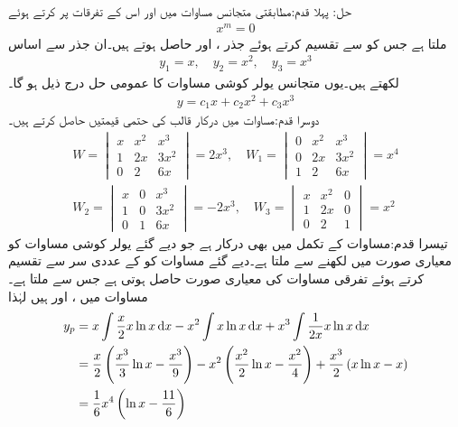 حل: پہلا قدم:\quad مطابقتی متجانس مساوات میں  اور اس کے تفرقات  پر کرتے ہوئے
\begin{align*}
[m(m-1)(m-1)-3m(m-1)+6m-6]x^m=0
\end{align*}
ملتا ہے جس کو  سے تقسیم کرتے ہوئے  جذر ،  اور  حاصل ہوتے ہیں۔ان جذر سے اساس
\begin{align*}
y_1=x, \quad y_2=x^2,\quad y_3=x^3
\end{align*}
لکھتے ہیں۔یوں متجانس یولر کوشی مساوات کا عمومی حل درج ذیل ہو گا۔
\begin{align*}
y=c_1x+c_2x^2+c_3x^3
\end{align*}
دوسرا قدم:\quad مساوات  میں درکار قالب کی حتمی قیمتیں حاصل کرتے ہیں۔
\begin{align*}
W=
\begin{vmatrix}
x & x^2 & x^3\\
1 & 2x & 3x^2\\
0 & 2 &  6x
\end{vmatrix}=2x^3, \quad
W_1=
\begin{vmatrix}
0 & x^2 & x^3\\
0 & 2x & 3x^2\\
1 & 2 &  6x
\end{vmatrix}=x^4\\
W_2=
\begin{vmatrix}
x & 0 & x^3\\
1 & 0 & 3x^2\\
0 & 1 &  6x
\end{vmatrix}=-2x^3, \quad
W_3=
\begin{vmatrix}
x & x^2 &0\\
1 & 2x & 0\\
0 & 2 &  1
\end{vmatrix}=x^2
\end{align*}
تیسرا قدم:\quad مساوات  کے تکمل میں  بھی درکار ہے جو دیے گئے یولر کوشی مساوات کو معیاری صورت میں لکھنے سے ملتا ہے۔دیے گئے مساوات کو  کے عددی سر   سے تقسیم کرتے ہوئے تفرقی مساوات کی معیاری صورت حاصل ہوتی ہے جس سے  ملتا ہے۔مساوات   میں ،  اور
  ہیں لہٰذا 
\begin{align*}
y_p&=x\int \frac{x}{2} x\ln x \dif x-x^2\int x\ln x \dif x+x^3\int \frac{1}{2x} x\ln x \dif x\\
&=\frac{x}{2}\left(\frac{x^3}{3}\ln x -\frac{x^3}{9}\right)-x^2\left(\frac{x^2}{2}\ln x-\frac{x^2}{4}\right)+\frac{x^3}{2}\left(x\ln x-x\right)\\
&=\frac{1}{6}x^4\left(\ln x-\frac{11}{6}\right)
\end{align*}

